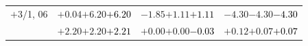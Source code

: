 \documentclass[compress]{beamer}
\begin{document}
\begin{frame}
\begin{tabular}{r | c | c | c}
$+$3/1, 06 & $+0.04$\hspace{0.1 cm}$+6.20$\hspace{0.1 cm}\textcolor{black}{$+6.20$} & $-1.85$\hspace{0.1 cm}$+1.11$\hspace{0.1 cm}\textcolor{black}{$+1.11$} & $-4.30$\hspace{0.1 cm}$-4.30$\hspace{0.1 cm}\textcolor{black}{$-4.30$} \\
           & $+2.20$\hspace{0.1 cm}$+2.20$\hspace{0.1 cm}\textcolor{black}{$+2.21$} & $+0.00$\hspace{0.1 cm}$+0.00$\hspace{0.1 cm}\textcolor{black}{$-0.03$} & $+0.12$\hspace{0.1 cm}$+0.07$\hspace{0.1 cm}\textcolor{black}{$+0.07$} \\
\end{tabular}
\end{frame}
\end{document}
